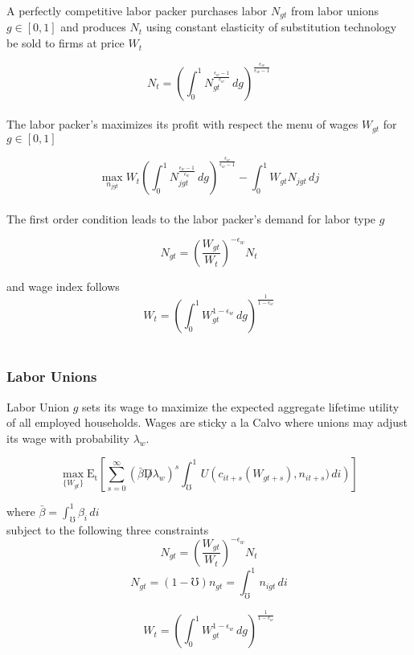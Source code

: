 \documentclass[titlepage]{\econtex}\providecommand{\texname}{BufferStockTheory}
\begin{document}
A perfectly competitive labor packer purchases labor $N_{gt}$ from labor unions $g \in [0,1]$ and produces $N_{t}$ using constant elasticity of substitution technology be sold to firms at price $W_{t}$

 
$$ N_{t} = \left(\int_{0}^{1} N_{gt}^{\frac{\epsilon_{w}-1}{\epsilon_{w}}}\,dg\right)^{\frac{\epsilon_{w}}{\epsilon_{w}-1}}$$ \\

The labor packer's maximizes its profit with respect the menu of wages $W_{gt}$ for $ g \in  [0,1]$

$$ \max_{n_{jgt}} W_{t} \left(\int_{0}^{1} N_{jgt}^{\frac{\epsilon_{w}-1}{\epsilon_{w}}} \, dg \right)^ {\frac{\epsilon_{w}}{\epsilon_{w}-1}} - \int_{0}^{1} W_{gt}N_{jgt}\, dj $$ \\


The first order condition leads to the labor packer's demand for labor type $g$

$$ N_{gt} = \left(\frac{W_{gt}}{W_{t}}\right)^{-\epsilon_{w}} N_{t} $$

and wage index follows
$$ W_{t} = \left(\int_{0}^{1} W_{gt}^{1-\epsilon_{w}}\,dg\right)^{\frac{1}{1-\epsilon_{w}}}$$ \\




\hypertarget{Labor Unions}{}
\subsubsection{Labor Unions}

Labor Union $g$  sets its wage to maximize the expected aggregate lifetime utility of all employed households. Wages are sticky a la Calvo where unions may adjust its wage with probability $\lambda_{w}$. 

$$ \max_{\{W_{gt}\}} \mathrm{E_{t}}\left[\sum_{s=0}^{\infty} (\bar{\beta} \not D \lambda_{w})^{s} \int_{\mho}^{1}  U\left (c_{it+s}(W_{gt+s}), n_{i t+s}) \, di \right)\right] $$

where $\bar{\beta} = \int_{\mho}^{1} \beta_{i} \, di$ \\

subject to the following three constraints $$ N_{gt} = \left(\frac{W_{gt}}{W_{t}}\right)^{-\epsilon_{w}} N_{t} $$
$$  N_{gt} = (1-\mho) \mathit{n}_{gt} = \int_{\mho}^{1} n_{igt}\,di $$ 

$$ W_{t} = \left(\int_{0}^{1} W_{gt}^{1-\epsilon_{w}}\,dg\right)^{\frac{1}{1-\epsilon_{w}}}$$ \\
\end{document}
